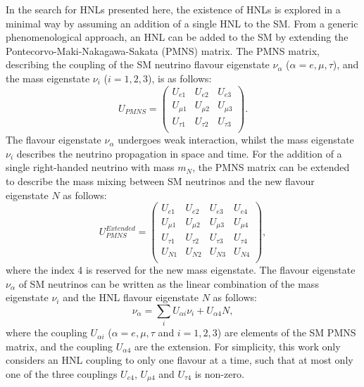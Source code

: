 In the search for HNLs presented here, the existence of HNLs is explored in a minimal way by assuming an addition of a single HNL to the SM.  
From a generic phenomenological approach, an HNL can be added to the SM by extending the Pontecorvo-Maki-Nakagawa-Sakata (PMNS) matrix.
The PMNS matrix, describing the coupling of the SM neutrino flavour eigenstate $\nu_{\alpha}$ ($\alpha=e,\mu,\tau$), and the mass eigenstate $\nu_{i}$ ($i=1,2,3$), is as follows:
\begin{equation}
	U_{PMNS} =
	\begin{pmatrix}
		U_{e1} & U_{e2} & U_{e3}\\
		U_{\mu1} & U_{\mu2} & U_{\mu3}\\
		U_{\tau1} & U_{\tau2} & U_{\tau3}\\
	\end{pmatrix}.
\end{equation}
The flavour eigenstate $\nu_{\alpha}$ undergoes weak interaction, whilst the mass eigenstate $\nu_{i}$ describes the neutrino propagation in space and time.
For the addition of a single right-handed neutrino with mass $m_{N}$, the PMNS matrix can be extended to describe the mass mixing between SM neutrinos and the new flavour eigenstate $N$ as follows:
\begin{equation}
	U_{PMNS}^{Extended} =
	\begin{pmatrix}
		U_{e1} & U_{e2} & U_{e3} & U_{e4}\\
		U_{\mu1} & U_{\mu2} & U_{\mu3} & U_{\mu4}\\
		U_{\tau1} & U_{\tau2} & U_{\tau3} & U_{\tau4}\\
		U_{N1} & U_{N2} & U_{N3} & U_{N4}\\
	\end{pmatrix},
\end{equation}
where the index 4 is reserved for the new mass eigenstate.
The flavour eigenstate  $\nu_{\alpha}$ of SM neutrinos can be written as the linear combination of the mass eigenstate $\nu_{i}$ and the HNL flavour eigenstate $N$ as follows:
\begin{equation}
	\nu_{\alpha}=\sum_i U_{\alpha i}\nu_{i} + U_{\alpha 4}N,
\end{equation}
where the coupling $U_{\alpha i }$ ($\alpha=e,\mu,\tau$ and $i=1,2,3$) are elements of the SM PMNS matrix, and the coupling $U_{\alpha 4}$ are the extension.
For simplicity, this work only considers an HNL coupling to only one flavour at a time, such that at most only one of the three couplings $U_{e4}$, $U_{\mu4}$ and $U_{\tau4}$ is non-zero.

